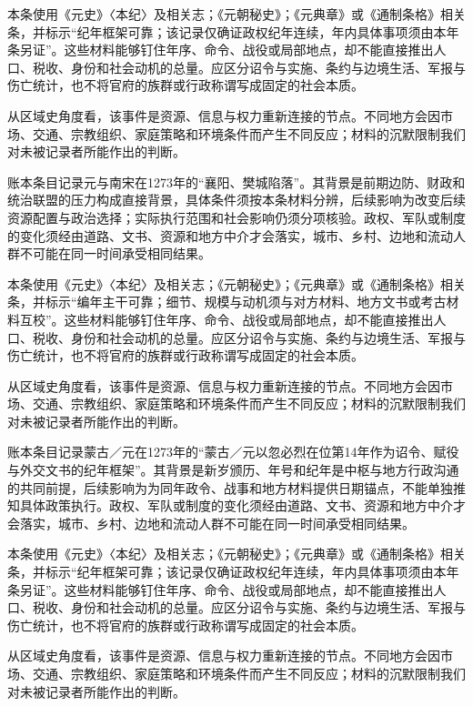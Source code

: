 本条使用《元史》〈本纪〉及相关志；《元朝秘史》；《元典章》或《通制条格》相关条，并标示“纪年框架可靠；该记录仅确证政权纪年连续，年内具体事项须由本年条另证”。这些材料能够钉住年序、命令、战役或局部地点，却不能直接推出人口、税收、身份和社会动机的总量。应区分诏令与实施、条约与边境生活、军报与伤亡统计，也不将官府的族群或行政称谓写成固定的社会本质。

从区域史角度看，该事件是资源、信息与权力重新连接的节点。不同地方会因市场、交通、宗教组织、家庭策略和环境条件而产生不同反应；材料的沉默限制我们对未被记录者所能作出的判断。

账本条目记录元与南宋在1273年的“襄阳、樊城陷落”。其背景是前期边防、财政和统治联盟的压力构成直接背景，具体条件须按本条材料分辨，后续影响为改变后续资源配置与政治选择；实际执行范围和社会影响仍须分项核验。政权、军队或制度的变化须经由道路、文书、资源和地方中介才会落实，城市、乡村、边地和流动人群不可能在同一时间承受相同结果。

本条使用《元史》〈本纪〉及相关志；《元朝秘史》；《元典章》或《通制条格》相关条，并标示“编年主干可靠；细节、规模与动机须与对方材料、地方文书或考古材料互校”。这些材料能够钉住年序、命令、战役或局部地点，却不能直接推出人口、税收、身份和社会动机的总量。应区分诏令与实施、条约与边境生活、军报与伤亡统计，也不将官府的族群或行政称谓写成固定的社会本质。

从区域史角度看，该事件是资源、信息与权力重新连接的节点。不同地方会因市场、交通、宗教组织、家庭策略和环境条件而产生不同反应；材料的沉默限制我们对未被记录者所能作出的判断。

账本条目记录蒙古／元在1273年的“蒙古／元以忽必烈在位第14年作为诏令、赋役与外交文书的纪年框架”。其背景是新岁颁历、年号和纪年是中枢与地方行政沟通的共同前提，后续影响为为同年政令、战事和地方材料提供日期锚点，不能单独推知具体政策执行。政权、军队或制度的变化须经由道路、文书、资源和地方中介才会落实，城市、乡村、边地和流动人群不可能在同一时间承受相同结果。

本条使用《元史》〈本纪〉及相关志；《元朝秘史》；《元典章》或《通制条格》相关条，并标示“纪年框架可靠；该记录仅确证政权纪年连续，年内具体事项须由本年条另证”。这些材料能够钉住年序、命令、战役或局部地点，却不能直接推出人口、税收、身份和社会动机的总量。应区分诏令与实施、条约与边境生活、军报与伤亡统计，也不将官府的族群或行政称谓写成固定的社会本质。

从区域史角度看，该事件是资源、信息与权力重新连接的节点。不同地方会因市场、交通、宗教组织、家庭策略和环境条件而产生不同反应；材料的沉默限制我们对未被记录者所能作出的判断。

